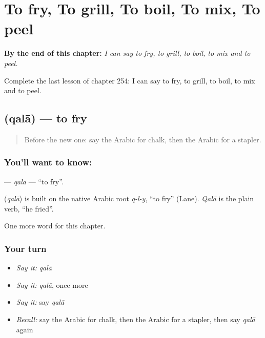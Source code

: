 
\chapter{To fry, To grill, To boil, To mix, To peel}
\label{ch:ar-to-fry-to-grill-to-boil-to-mix-to-peel}

\begin{chapteropening}
\textbf{By the end of this chapter:} \emph{I can say to fry, to grill, to boil, to mix and to peel.}

Complete the last lesson of chapter 254: I can say to fry, to grill, to boil, to mix and to peel.
\end{chapteropening}

\section[\texorpdfstring{\ar{قلى} (qalā)}{قلى (qalā)}]{ (qalā) — to fry}

\label{lesson:AR-C254-qala}



\begin{quote}
Before the new one: say the Arabic for chalk, then the Arabic for a stapler.
\end{quote}

\subsection*{You'll want to know: }
\textbf{} — \emph{qalā} — \textquotedblleft{}to fry\textquotedblright{}.

\begin{cousinweb}
\textbf{} (\emph{qalā}) is built on the native Arabic root \emph{q-l-y}, \textquotedblleft{}to fry\textquotedblright{} (Lane). \emph{Qalā} is the plain verb, \textquotedblleft{}he fried\textquotedblright{}.
\end{cousinweb}

\begin{grammarlens}[title={What you've built}]
One more word for this chapter.
\end{grammarlens}

\subsection*{Your turn}
\begin{itemize}
\raggedright
  \item \emph{Say it:} \emph{qalā}
  \item \emph{Say it:} \emph{qalā}, once more
  \item \emph{Say it:} say \emph{qalā}
  \item \emph{Recall:} say the Arabic for chalk, then the Arabic for a stapler, then say \emph{qalā} again
\end{itemize}

